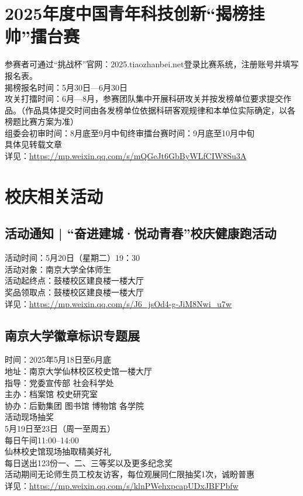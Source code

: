 \documentclass[letterpaper, 12pt]{article}
\begin{document}
\begin{multicols}{2}
\section{2025年度中国青年科技创新“揭榜挂帅”擂台赛} %
参赛者可通过“挑战杯”官网：2025.tiaozhanbei.net登录比赛系统，注册账号并填写报名表。
\\揭榜报名时间：5月30日—6月30日
\\攻关打擂时间：6月—8月，参赛团队集中开展科研攻关并按发榜单位要求提交作品。（作品具体提交时间由各发榜单位依据科研客观规律和本单位实际确定，以各榜题比赛方案为准）
\\组委会初审时间：8月底至9月中旬终审擂台赛时间：9月底至10月中旬
\\具体见转载文章
\\详见：\url{https://mp.weixin.qq.com/s/mQGeJt6GbByWLfCIW8Su3A}



\section{校庆相关活动}
\subsection{活动通知 | “奋进建城·悦动青春”校庆健康跑活动} %
活动时间：5月20日（星期二）19：30
\\活动对象：南京大学全体师生
\\活动起终点：鼓楼校区建良楼一楼大厅
\\奖品领取点：鼓楼校区建良楼一楼大厅
\\详见：\url{https://mp.weixin.qq.com/s/J6_jsOd4-g-JiM8Nwi_u7w}
\subsection{南京大学徽章标识专题展} %
时间：2025年5月18日至6月底
\\地址：南京大学仙林校区校史馆一楼大厅
\\指导：党委宣传部 社会科学处
\\主办：档案馆 校史研究室
\\协办：后勤集团 图书馆 博物馆 各学院
\\活动现场抽奖
\\5月19日至23日（周一至周五）
\\每日午间11:00–14:00
\\仙林校史馆现场抽取精美好礼
\\每日送出123份一、二、三等奖以及更多纪念奖
\\活动期间无论师生员工校友访客，每位观展同仁限抽奖1次，诚盼普惠
\\详见：\url{https://mp.weixin.qq.com/s/klnPWehxpcapUDxJBFPbfw}


\end{multicols}
\end{document}
